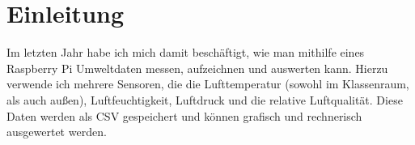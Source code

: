 \chapter{Einleitung}

Im letzten Jahr habe ich mich damit beschäftigt, wie man mithilfe eines Raspberry Pi Umweltdaten messen, aufzeichnen und auswerten kann. Hierzu verwende ich mehrere Sensoren, die die Lufttemperatur (sowohl im Klassenraum, als auch außen), Luftfeuchtigkeit, Luftdruck und die relative Luftqualität. Diese Daten werden als \gls{CSV} gespeichert und können grafisch und rechnerisch ausgewertet werden.
